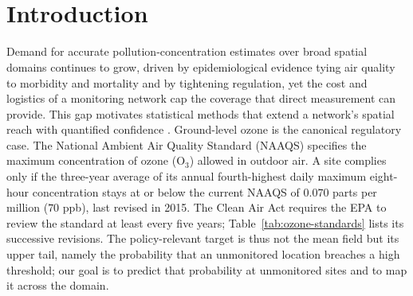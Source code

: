 \documentclass[12pt]{article}
\begin{document}
\newpage
\setcounter{page}{3}
\WatermarkOn                            %
\tableofcontents
{} %


\newpage
\setcounter{page}{5}
\WatermarkOn                            %
\listoffigures
{} %

\newpage
\thispagestyle{empty}                   %
\WatermarkOff                           %
~

\newpage
\setcounter{page}{6}
\WatermarkOn                            %
\listoftables
{} %

\newpage
\thispagestyle{empty}                   %
\WatermarkOff                           %
~

\newpage
\section{Introduction}
\setcounter{page}{1}                    %
\WatermarkOn                            %

Demand for accurate pollution-concentration estimates over broad spatial
domains continues to grow, driven by epidemiological evidence tying air quality
to morbidity and mortality and by tightening regulation, yet the cost and
logistics of a monitoring network cap the coverage that direct measurement can
provide. This gap motivates statistical methods
that extend a network's spatial reach with quantified confidence
\parencite{epa2024downscaler}. Ground-level ozone is the canonical regulatory
case. The National Ambient Air Quality Standard (NAAQS) specifies the maximum
concentration of ozone (O$_3$) allowed in outdoor air.  A site complies only if
the three-year average of its annual fourth-highest daily maximum eight-hour
concentration stays at or below the current NAAQS of $0.070$ parts per million
($70$ ppb), last revised in 2015. The Clean Air Act requires the EPA to review
the standard at least every five years; Table~\ref{tab:ozone-standards} lists
its successive revisions.
The policy-relevant target is thus not the mean field but its upper tail,
namely the probability that an unmonitored location breaches a high threshold;
our goal is to predict that probability at unmonitored sites and to map it
across the domain.
\end{document}
